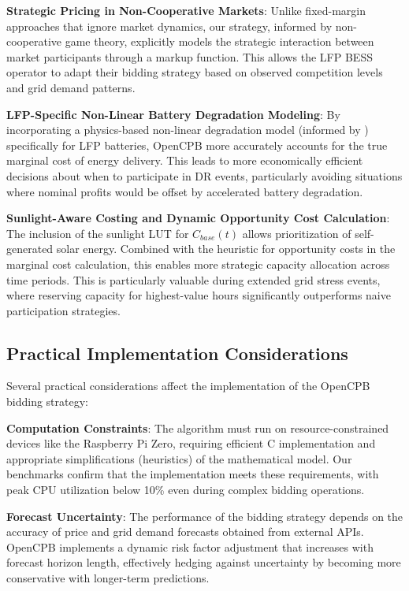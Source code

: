 \documentclass[11pt,a4paper]{article}
\begin{document}
\textbf{Strategic Pricing in Non-Cooperative Markets}: Unlike fixed-margin approaches that ignore market dynamics, our strategy, informed by non-cooperative game theory, explicitly models the strategic interaction between market participants through a markup function. This allows the LFP BESS operator to adapt their bidding strategy based on observed competition levels and grid demand patterns.

\textbf{LFP-Specific Non-Linear Battery Degradation Modeling}: By incorporating a physics-based non-linear degradation model (informed by \citet{Millner2010}) specifically for LFP batteries, OpenCPB more accurately accounts for the true marginal cost of energy delivery. This leads to more economically efficient decisions about when to participate in DR events, particularly avoiding situations where nominal profits would be offset by accelerated battery degradation.

\textbf{Sunlight-Aware Costing and Dynamic Opportunity Cost Calculation}: The inclusion of the sunlight LUT for $C_{base}(t)$ allows prioritization of self-generated solar energy. Combined with the heuristic for opportunity costs in the marginal cost calculation, this enables more strategic capacity allocation across time periods. This is particularly valuable during extended grid stress events, where reserving capacity for highest-value hours significantly outperforms naive participation strategies.

\subsection{Practical Implementation Considerations}
Several practical considerations affect the implementation of the OpenCPB bidding strategy:

\textbf{Computation Constraints}: The algorithm must run on resource-constrained devices like the Raspberry Pi Zero, requiring efficient C implementation and appropriate simplifications (heuristics) of the mathematical model. Our benchmarks confirm that the implementation meets these requirements, with peak CPU utilization below 10\% even during complex bidding operations.

\textbf{Forecast Uncertainty}: The performance of the bidding strategy depends on the accuracy of price and grid demand forecasts obtained from external APIs. OpenCPB implements a dynamic risk factor adjustment that increases with forecast horizon length, effectively hedging against uncertainty by becoming more conservative with longer-term predictions.
\end{document}
